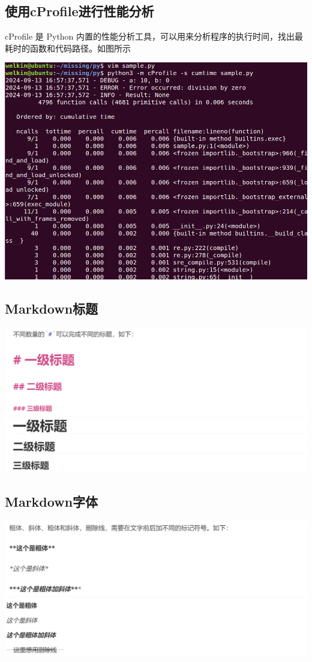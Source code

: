 \documentclass[UTF8,a4paper]{ctexart}
\begin{document}
\begin{sloppypar}
	\subsection{使用cProfile进行性能分析}
	cProfile 是 Python 内置的性能分析工具，可以用来分析程序的执行时间，找出最耗时的函数和代码路径。如图所示
	
	\includegraphics[width = 16cm]{4}
	
	\subsection{Markdown标题}
	
	\includegraphics[width = 16cm]{51}
	\includegraphics[width = 16cm]{52}
	
	\subsection{Markdown字体}

	\includegraphics[width = 16cm]{61}
	\includegraphics[width = 16cm]{62}
	

\end{sloppypar}
\end{document}
